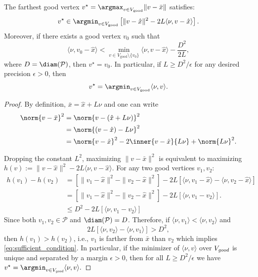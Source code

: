\begin{lemma}\label{lem:farthest_exact}
The farthest good vertex $v^\star = \argmax_{v \in V_{\text{good}}} \|v - \bar{x}\|$ satisfies:
\begin{equation}
v^\star \in \argmin_{v \in V_{\text{good}}} \left[ \|v - \hat{x}\|^2 - 2L\langle \nu, v - \hat{x}\rangle \right].
\end{equation}
Moreover, if there exists a good vertex $v_0$ such that
\begin{equation}\label{eq:sufficient_condition}
\langle \nu, v_0 - \hat{x}\rangle < \min_{v \in V_{\text{good}} \setminus \{v_0\}} \langle \nu, v - \hat{x}\rangle - \frac{D^2}{2L},
\end{equation}
where $D = \diam(\mathcal{P})$, then $v^\star = v_0$.
In particular, if $L \geq D^2/\epsilon$ for any desired precision $\epsilon > 0$, then
\begin{equation}
v^\star = \argmin_{v \in V_{\text{good}}} \langle \nu, v \rangle.
\end{equation}
\end{lemma}

\begin{proof}
By definition, $\bar{x} = \hat{x} + L\nu$ and one can write
\begin{align*}
\norm{v - \bar{x}}^2 &= \norm{v - (\hat{x} + L\nu)}^2 \\
&= \norm{(v - \hat{x}) - L\nu}^2 \\
&= \norm{v - \hat{x}}^2 - 2\inner{v - \hat{x}}{L\nu} + \norm{L\nu}^2.
\end{align*}

Dropping the constant $L^2$, maximizing $\|v - \bar{x}\|^2$ is equivalent to maximizing $
h(v) := \|v - \hat{x}\|^2 - 2L\langle \nu, v - \hat{x}\rangle.
$ For any two good vertices $v_1, v_2$:
\begin{align*}
h(v_1) - h(v_2) &= [\|v_1 - \hat{x}\|^2 - \|v_2 - \hat{x}\|^2] - 2L[\langle \nu, v_1 - \hat{x}\rangle - \langle \nu, v_2 - \hat{x}\rangle] \\
&= [\|v_1 - \hat{x}\|^2 - \|v_2 - \hat{x}\|^2]  - 2L  [\langle \nu, v_1 - v_2\rangle].\\
&\leq D^2 - 2L  [\langle \nu, v_1 - v_2\rangle]
\end{align*}
Since both $v_1, v_2 \in \mathcal{P}$ and $\diam(\mathcal{P}) = D$.
Therefore, if $\langle \nu, v_1\rangle < \langle \nu, v_2\rangle$ and 
\begin{equation*}
2L  [\langle \nu, v_2\rangle - \langle \nu, v_1\rangle] > D^2,
\end{equation*}
then $h(v_1) > h(v_2)$, i.e., $v_1$ is farther from $\bar{x}$ than $v_2$ which implies \eqref{eq:sufficient_condition}. In particular, if the minimizer of $\langle \nu, v\rangle$ over $V_{\emph{good}}$
is unique and separated by a margin $\epsilon > 0$, then for all
$L \ge D^2/\epsilon$ we have $v^\star = \argmin_{v \in V_{\emph{good}}} \langle \nu, v \rangle.$
\end{proof}

